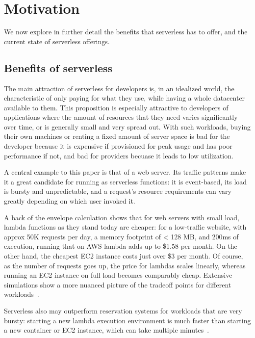\section{Motivation}\label{motivation}

We now explore in further detail the benefits that serverless has to offer, and
the current state of serverless offerings.

\subsection{Benefits of serverless}

The main attraction of serverless for developers is, in an idealized world, the
characteristic of only paying for what they use, while having a whole datacenter
available to them. This proposition is especially attractive to developers of
applications where the amount of resources that they need varies significantly
over time, or is generally small and very spread out. With such workloads,
buying their own machines or renting a fixed amount of server space is bad for
the developer because it is expensive if provisioned for peak usage and has poor
performance if not, and bad for providers becuase it leads to low utilization.

A central example to this paper is that of a web server. Its traffic patterns
make it a great candidate for running as serverless functions: it is
event-based, its load is bursty and unpredictable, and a request's resource
requirements can vary greatly depending on which user invoked it.


A back of the envelope calculation shows that for web servers with small load,
lambda functions as they stand today are cheaper: for a low-traffic website,
with approx 50K requests per day, a memory footprint of < 128 MB, and 200ms of
execution, running that on AWS lambda adds up to \$1.58 per month. On the other
hand, the cheapest EC2 instance costs just over \$3 per month. Of course, as the
number of requests goes up, the price for lambdas scales linearly, whereas
running an EC2 instance on full load becomes comparably cheap. Extensive
simulations show a more nuanced picture of the tradeoff points for different
workloads~\cite{econ-of-serverless,trek10-blog}.

Serverless also may outperform reservation systems for workloads that are very
bursty: starting a new lambda execution environment is much faster than starting
a new container or EC2 instance, which can take multiple
minutes~\cite{ec2-autoscaling}.



